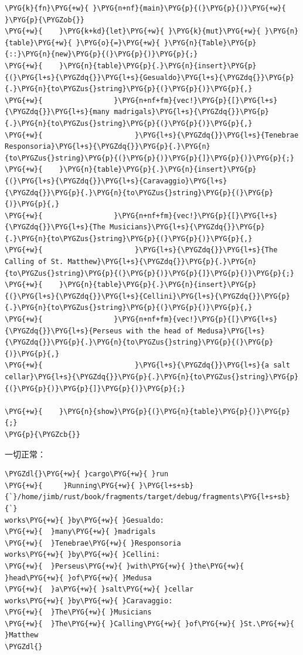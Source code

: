 \begin{Verbatim}[commandchars=\\\{\},breaklines=true,breakanywhere=true,fontsize=\codefont,xleftmargin=17bp]
\PYG{k}{fn}\PYG{+w}{ }\PYG{n+nf}{main}\PYG{p}{(}\PYG{p}{)}\PYG{+w}{ }\PYG{p}{\PYGZob{}}
\PYG{+w}{    }\PYG{k+kd}{let}\PYG{+w}{ }\PYG{k}{mut}\PYG{+w}{ }\PYG{n}{table}\PYG{+w}{ }\PYG{o}{=}\PYG{+w}{ }\PYG{n}{Table}\PYG{p}{::}\PYG{n}{new}\PYG{p}{(}\PYG{p}{)}\PYG{p}{;}
\PYG{+w}{    }\PYG{n}{table}\PYG{p}{.}\PYG{n}{insert}\PYG{p}{(}\PYG{l+s}{\PYGZdq{}}\PYG{l+s}{Gesualdo}\PYG{l+s}{\PYGZdq{}}\PYG{p}{.}\PYG{n}{to\PYGZus{}string}\PYG{p}{(}\PYG{p}{)}\PYG{p}{,}
\PYG{+w}{                 }\PYG{n+nf+fm}{vec!}\PYG{p}{[}\PYG{l+s}{\PYGZdq{}}\PYG{l+s}{many madrigals}\PYG{l+s}{\PYGZdq{}}\PYG{p}{.}\PYG{n}{to\PYGZus{}string}\PYG{p}{(}\PYG{p}{)}\PYG{p}{,}
\PYG{+w}{                      }\PYG{l+s}{\PYGZdq{}}\PYG{l+s}{Tenebrae Responsoria}\PYG{l+s}{\PYGZdq{}}\PYG{p}{.}\PYG{n}{to\PYGZus{}string}\PYG{p}{(}\PYG{p}{)}\PYG{p}{]}\PYG{p}{)}\PYG{p}{;}
\PYG{+w}{    }\PYG{n}{table}\PYG{p}{.}\PYG{n}{insert}\PYG{p}{(}\PYG{l+s}{\PYGZdq{}}\PYG{l+s}{Caravaggio}\PYG{l+s}{\PYGZdq{}}\PYG{p}{.}\PYG{n}{to\PYGZus{}string}\PYG{p}{(}\PYG{p}{)}\PYG{p}{,}
\PYG{+w}{                 }\PYG{n+nf+fm}{vec!}\PYG{p}{[}\PYG{l+s}{\PYGZdq{}}\PYG{l+s}{The Musicians}\PYG{l+s}{\PYGZdq{}}\PYG{p}{.}\PYG{n}{to\PYGZus{}string}\PYG{p}{(}\PYG{p}{)}\PYG{p}{,}
\PYG{+w}{                      }\PYG{l+s}{\PYGZdq{}}\PYG{l+s}{The Calling of St. Matthew}\PYG{l+s}{\PYGZdq{}}\PYG{p}{.}\PYG{n}{to\PYGZus{}string}\PYG{p}{(}\PYG{p}{)}\PYG{p}{]}\PYG{p}{)}\PYG{p}{;}
\PYG{+w}{    }\PYG{n}{table}\PYG{p}{.}\PYG{n}{insert}\PYG{p}{(}\PYG{l+s}{\PYGZdq{}}\PYG{l+s}{Cellini}\PYG{l+s}{\PYGZdq{}}\PYG{p}{.}\PYG{n}{to\PYGZus{}string}\PYG{p}{(}\PYG{p}{)}\PYG{p}{,}
\PYG{+w}{                 }\PYG{n+nf+fm}{vec!}\PYG{p}{[}\PYG{l+s}{\PYGZdq{}}\PYG{l+s}{Perseus with the head of Medusa}\PYG{l+s}{\PYGZdq{}}\PYG{p}{.}\PYG{n}{to\PYGZus{}string}\PYG{p}{(}\PYG{p}{)}\PYG{p}{,}
\PYG{+w}{                      }\PYG{l+s}{\PYGZdq{}}\PYG{l+s}{a salt cellar}\PYG{l+s}{\PYGZdq{}}\PYG{p}{.}\PYG{n}{to\PYGZus{}string}\PYG{p}{(}\PYG{p}{)}\PYG{p}{]}\PYG{p}{)}\PYG{p}{;}

\PYG{+w}{    }\PYG{n}{show}\PYG{p}{(}\PYG{n}{table}\PYG{p}{)}\PYG{p}{;}
\PYG{p}{\PYGZcb{}}
\end{Verbatim}

一切正常：

\begin{Verbatim}[commandchars=\\\{\},breaklines=true,breakanywhere=true,fontsize=\codefont,xleftmargin=17bp]
\PYGZdl{}\PYG{+w}{ }cargo\PYG{+w}{ }run
\PYG{+w}{     }Running\PYG{+w}{ }\PYG{l+s+sb}{`}/home/jimb/rust/book/fragments/target/debug/fragments\PYG{l+s+sb}{`}
works\PYG{+w}{ }by\PYG{+w}{ }Gesualdo:
\PYG{+w}{  }many\PYG{+w}{ }madrigals
\PYG{+w}{  }Tenebrae\PYG{+w}{ }Responsoria
works\PYG{+w}{ }by\PYG{+w}{ }Cellini:
\PYG{+w}{  }Perseus\PYG{+w}{ }with\PYG{+w}{ }the\PYG{+w}{ }head\PYG{+w}{ }of\PYG{+w}{ }Medusa
\PYG{+w}{  }a\PYG{+w}{ }salt\PYG{+w}{ }cellar
works\PYG{+w}{ }by\PYG{+w}{ }Caravaggio:
\PYG{+w}{  }The\PYG{+w}{ }Musicians
\PYG{+w}{  }The\PYG{+w}{ }Calling\PYG{+w}{ }of\PYG{+w}{ }St.\PYG{+w}{ }Matthew
\PYGZdl{}
\end{Verbatim}

